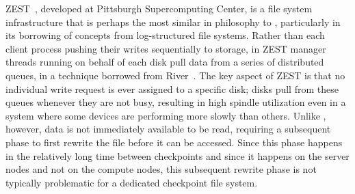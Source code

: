 ZEST~\cite{zest}, developed at Pittsburgh Supercomputing Center, is a file
system infrastructure that is perhaps the most similar in philosophy to \plfs,
particularly in its borrowing of concepts from log-structured file systems.
Rather than each client process pushing their writes sequentially to storage,
in ZEST manager threads running on behalf of each disk pull data from a series
of distributed queues, in a technique borrowed from
River~\cite{Arpaci-Dusseau03-TOCS}.  The key aspect of ZEST is that no
individual write request is ever assigned to a specific disk; disks pull from
these queues whenever they are not busy, resulting in high spindle utilization
even in a system where some devices are performing more slowly than others.
Unlike \plfs, however, data is not immediately available to be read, requiring
a subsequent phase to first rewrite the file before it can be accessed.  Since
this phase happens in the relatively long time between checkpoints and since it
happens on the server nodes and not on the compute nodes, this subsequent
rewrite phase is not typically problematic for a dedicated checkpoint file
system.
